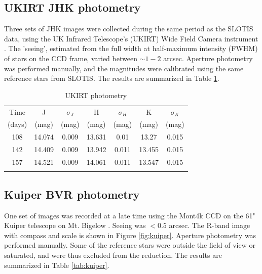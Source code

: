 \documentclass[iop]{emulateapj}
\begin{document}
\subsection{UKIRT JHK photometry} \label{obs:ukirt}
Three sets of JHK images were collected during the same period as the SLOTIS data, using the UK Infrared Telescope's (UKIRT) Wide Field Camera instrument \citep[WFCAM;][]{Hod09}. The 'seeing', estimated from the full width at half-maximum intensity (FWHM) of stars on the CCD frame, varied between $\sim1-2$ arcsec. Aperture photometry was performed manually, and the magnitudes were calibrated using the same reference stars from SLOTIS. The results are summarized in Table \ref{tab:ukirt}.

\begin{table}\begin{center}\begin{minipage}{3.25in}
      \caption{UKIRT photometry}
\centering
\scriptsize
\tighten
\begin{tabular}{@{}ccccccc}\hline\hline
Time &J &$\sigma_J$ &H &$\sigma_H$ &K &$\sigma_K$ \\
(days) &(mag) &(mag) &(mag) &(mag) &(mag) &(mag) \\
\hline
108 &14.074 &0.009 &13.631 &0.01  &13.27 &0.015 \\
142 &14.409 &0.009 &13.942 &0.011 &13.455 &0.015 \\
157 &14.521 &0.009 &14.061 &0.011 &13.547 &0.015 \\
\hline \\
\end{tabular}
\label{tab:ukirt}
\end{minipage}\end{center}
\end{table}

\subsection{Kuiper BVR photometry} \label{obs:kuiper}
One set of images was recorded at a late time using the Mont4k CCD on the 61" Kuiper telescope on Mt. Bigelow \citep{Fon14}. Seeing was $<0.5$ arcsec. The R-band image with compass and scale is shown in Figure \ref{fig:kuiper}. Aperture photometry was performed manually. Some of the reference stars were outside the field of view or saturated, and were thus excluded from the reduction. The results are summarized in Table \ref{tab:kuiper}.
\end{document}
